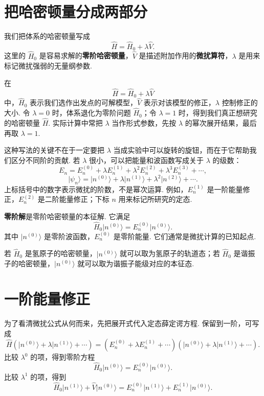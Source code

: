 \documentclass[UTF8,11pt,a4paper,openany]{ctexbook}
\newcommand{\ket}[1]{\lvert #1\rangle}\newcommand{\bra}[1]{\langle #1\rvert}
\newcommand{\term}[1]{\textbf{#1}}
\begin{document}
\section{把哈密顿量分成两部分}

我们把体系的哈密顿量写成
\[
\hat H=\hat H_0+\lambda\hat V.
\]
这里的 $\hat H_0$ 是容易求解的\term{零阶哈密顿量}，$\hat V$ 是描述附加作用的\term{微扰算符}，$\lambda$ 是用来标记微扰强弱的无量纲参数. 

\begin{notationbox}
在
\[
\hat H=\hat H_0+\lambda\hat V
\]
中，$\hat H_0$ 表示我们选作出发点的可解模型，$\hat V$ 表示对该模型的修正，$\lambda$ 控制修正的大小. 令 $\lambda=0$ 时，体系退化为零阶问题 $\hat H_0$；令 $\lambda=1$ 时，得到我们真正想研究的哈密顿量 $\hat H$. 实际计算中常把 $\lambda$ 当作形式参数，先按 $\lambda$ 的幂次展开结果，最后再取 $\lambda=1$. 
\end{notationbox}

这种写法的关键不在于一定要把 $\lambda$ 当成实验中可以旋转的旋钮，而在于它帮助我们区分不同阶的贡献. 若 $\lambda$ 很小，可以把能量和波函数写成关于 $\lambda$ 的级数：
\[
E_n=E_n^{(0)}+\lambda E_n^{(1)}
+\lambda^2E_n^{(2)}+\lambda^3E_n^{(3)}+\cdots,
\]
\[
\ket{\psi_n}
=\ket{n^{(0)}}+\lambda\ket{n^{(1)}}
+\lambda^2\ket{n^{(2)}}+\cdots.
\]
上标括号中的数字表示微扰的阶数，不是幂次运算. 例如，$E_n^{(1)}$ 是一阶能量修正，$E_n^{(2)}$ 是二阶能量修正；下标 $n$ 用来标记所研究的定态. 

\begin{definitionbox}
\term{零阶解}是零阶哈密顿量的本征解. 它满足
\[
\hat H_0\ket{n^{(0)}}=E_n^{(0)}\ket{n^{(0)}}.
\]
其中 $\ket{n^{(0)}}$ 是零阶波函数，$E_n^{(0)}$ 是零阶能量. 它们通常是微扰计算的已知起点. 
\end{definitionbox}

若 $\hat H_0$ 是氢原子的哈密顿量，$\ket{n^{(0)}}$ 就可以取为氢原子的轨道态；若 $\hat H_0$ 是谐振子的哈密顿量，$\ket{n^{(0)}}$ 就可以取为谐振子能级对应的本征态. 

\section{一阶能量修正}

为了看清微扰公式从何而来，先把展开式代入定态薛定谔方程. 保留到一阶，可写成
\[
\hat H
\left(\ket{n^{(0)}}+\lambda\ket{n^{(1)}}+\cdots\right)
=
\left(E_n^{(0)}+\lambda E_n^{(1)}+\cdots\right)
\left(\ket{n^{(0)}}+\lambda\ket{n^{(1)}}+\cdots\right).
\]
比较 $\lambda^0$ 的项，得到零阶方程
\[
\hat H_0\ket{n^{(0)}}=E_n^{(0)}\ket{n^{(0)}}.
\]
比较 $\lambda^1$ 的项，得到
\[
\hat H_0\ket{n^{(1)}}+\hat V\ket{n^{(0)}}
=
E_n^{(0)}\ket{n^{(1)}}+E_n^{(1)}\ket{n^{(0)}}.
\]
\end{document}
